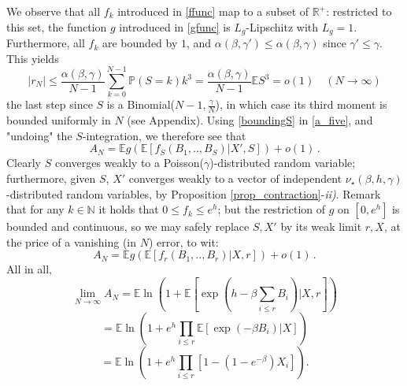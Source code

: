 \documentclass[a4paper,12pt,oneside,reqno]{amsart}
\numberwithin{equation}{section}
\begin{document}
We observe that all $f_k$ introduced in \eqref{ffunc} map to a subset of ${\mathbb{R}}^+$: restricted to this set, the function $g$ introduced in \eqref{gfunc} is $L_g$-Lipschitz with $L_g=1$. Furthermore, all $f_k$ are bounded by $1$, and $\alpha(\beta,\gamma') \leq \alpha(\beta,\gamma)$ since $\gamma'\leq \gamma$. This yields 
\begin{equation} \label{boundingS}
\left| r_N\right| \leq \frac{\alpha(\beta,\gamma)}{N-1}\sum\limits_{k=0}^{N-1}{\mathbb{P}}(S=k)k^3= \frac{\alpha(\beta,\gamma)}{N-1} {{\mathbb{E}}} S^3 = o(1) \quad (N\to \infty)
\end{equation}
the last step since $S$ is a Binomial($N-1, \frac{\gamma}{N} $), in which case its third moment is bounded uniformly in $N$ (see Appendix). Using \eqref{boundingS} in \eqref{a_five}, and "undoing" the $S$-integration,
we therefore see that
$$ A_N = {{\mathbb{E}}} g\left({{\mathbb{E}}}\left[ f_S(B_1,..,B_S)|X',S\right] \right)+o(1)\,.$$
Clearly $S$ converges weakly to a Poisson($\gamma$)-distributed random variable; furthermore, given $S$, $X'$ converges weakly to a vector of independent $\nu_\star({\beta},h,\gamma)$-distributed random variables, by Proposition \ref{prop_contraction}-{\it ii)}. Remark that for any $k \in {\mathbb{N}}$ it holds that $0\leq f_k \leq e^h$; but the restriction of $g$ on $[0,e^h]$ is
bounded and continuous, so we may safely replace $S,X'$ by its weak limit $r,X$, at the price of a vanishing (in $N$) error, to wit: 
$$ A_N = {{\mathbb{E}}} g\left({{\mathbb{E}}}\left[ f_r(B_1,..,B_r)|X,r\right] \right) + o(1)\,.$$
All in all, 
\begin{equation}
\lim\limits_{N\rightarrow \infty} A_N={{\mathbb{E}}} \ln\left(1+{{\mathbb{E}}}\left[\exp\left(h-\beta \sum\limits_{i\leq r} B_i\right)|X,r\right] \right)
\end{equation}
\begin{equation}
 ={{\mathbb{E}}} \ln\left(1+e^h\prod\limits_{i\leq r}{{\mathbb{E}}}\left[\exp\left(-\beta B_i\right)|X\right] \right)
\end{equation}
\begin{equation} \label{a-lim}
={{\mathbb{E}}} \ln\left(1+e^h\prod\limits_{i\leq r}\left[1-(1-e^{-\beta})X_i\right] \right). 
\end{equation}
\end{document}
